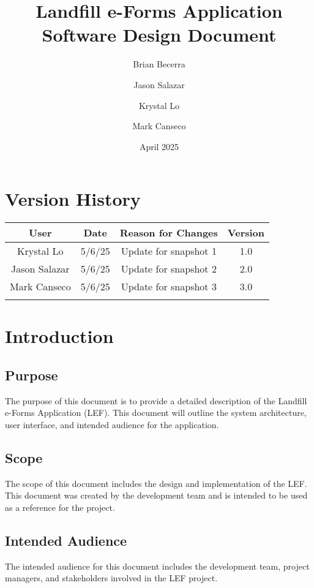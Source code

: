\documentclass[12pt]{article}
\title{Landfill e-Forms Application\\
Software Design Document}
\author{
    Brian Becerra\\
    \and
    Jason Salazar\\
    \and
    Krystal Lo\\
    \and
    Mark Canseco\\
    }
\date{April 2025}
\begin{document}
\begin{titlepage}
\maketitle
\thispagestyle{empty}
\end{titlepage}

\thispagestyle{empty}
\tableofcontents
\newpage

\section*{Version History}
\begin{table}[ht]
    \centering
    \begin{tabular}{|c|c|c|c|}
    \hline
    \textbf{User} & \textbf{Date} & \textbf{Reason for Changes} & \textbf{Version}\\
    \hline
         Krystal Lo &  5/6/25 &  Update for snapshot 1 & 1.0 \\
    \hline
         Jason Salazar & 5/6/25 & Update for snapshot 2 & 2.0\\
    \hline
         Mark Canseco & 5/6/25 & Update for snapshot 3 & 3.0 \\
    \hline
         &  &  & \\
    \hline
    \end{tabular}
\end{table}
\newpage

\section{Introduction}
\subsection{Purpose}
The purpose of this document is to provide a detailed description of the Landfill e-Forms Application (LEF). This document will outline the system architecture, user interface, and intended audience for the application.
\subsection{Scope}
The scope of this document includes the design and implementation of the LEF. This document was created by the development team and is intended to be used as a reference for the project.
\subsection{Intended Audience}
The intended audience for this document includes the development team, project managers, and stakeholders involved in the LEF project. 
\end{document}
